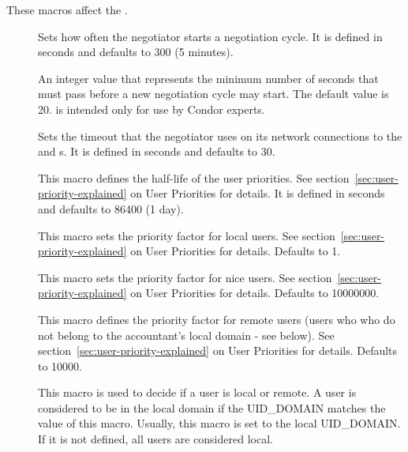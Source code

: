 These macros affect the .
\begin{description}
  
\item[] \label{param:NegotiatorInterval}
  Sets how often the negotiator starts a negotiation cycle.  It is defined
  in seconds and defaults to 300 (5 minutes).
  
\item[] \label{param:NegotiatorCycleDelay}
  An integer value that represents the minimum number of seconds
  that must pass before a new negotiation cycle may start.
  The default value is 20.
   is intended only for use by
  Condor experts.

\item[] \label{param:NegotiatorTimeout}
  Sets the timeout that the negotiator uses on its network connections
  to the  and s.  It is defined in seconds and defaults to 30.
  
\item[] \label{param:PriorityHalfLife} This
  macro defines the half-life of the user priorities.  See
  section~\ref{sec:user-priority-explained}
  on User Priorities for details.  It is defined in seconds and defaults
  to 86400 (1 day).

\item[] \label{param:DefaultPrioFactor} 
  This macro sets the priority factor for local users. See
  section~\ref{sec:user-priority-explained}
  on User Priorities for details.  Defaults to 1.

\item[] \label{param:NiceUserPrioFactor} 
  This macro sets the priority factor for nice users. See
  section~\ref{sec:user-priority-explained}
  on User Priorities for details.  Defaults to 10000000.

\item[] \label{param:RemotePrioFactor} 
  This macro defines the priority factor for remote users (users who
  who do not belong to the accountant's local domain - see
  below). See section~\ref{sec:user-priority-explained}
  on User Priorities for details.  Defaults to 10000.

\item[] \label{param:AccountantLocalDomain} 
  This macro is used to decide if a user is local or remote. A user
  is considered to be in the local domain if the UID\_DOMAIN matches
  the value of this macro. Usually, this macro is set
  to the local UID\_DOMAIN. If it is not defined, all users are considered
  local.


\end{description}
